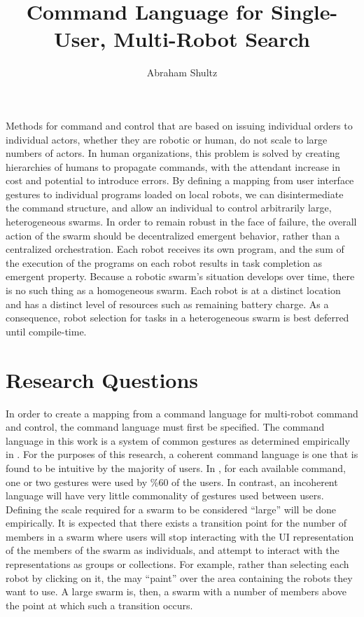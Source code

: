 \documentclass[]{article}
\title{Command Language for Single-User, Multi-Robot Search}
\author{Abraham Shultz}
\begin{document}
\maketitle

\begin{abstract}

\end{abstract}

Methods for command and control that are based on issuing individual orders to individual actors, whether they are robotic or human, do not scale to large numbers of actors. 
In human organizations, this problem is solved by creating hierarchies of humans to propagate commands, with the attendant increase in cost and potential to introduce errors. 
By defining a mapping from user interface gestures to individual programs loaded on local robots, we can disintermediate the command structure, and allow an individual to control arbitrarily large, heterogeneous swarms.
In order to remain robust in the face of failure, the overall action of the swarm should be decentralized emergent behavior, rather than a centralized orchestration. 
Each robot receives its own program, and the sum of the execution of the programs on each robot results in task completion as emergent property.
Because a robotic swarm's situation develops over time, there is no such thing as a homogeneous swarm.
Each robot is at a distinct location and has a distinct level of resources such as remaining battery charge. 
As a consequence, robot selection for tasks in a heterogeneous swarm is best deferred until compile-time.

\section{Research Questions}

In order to create a mapping from a command language for multi-robot command and control, the command language must first be specified. 
The command language in this work is a system of common gestures as determined empirically in \cite{Micire:2009:ANG:1731903.1731912}. 
For the purposes of this research, a coherent command language is one that is found to be intuitive by the majority of users. 
In \cite{Micire:2009:ANG:1731903.1731912}, for each available command, one or two gestures were used by \%60 of the users. 
In contrast, an incoherent language will have very little commonality of gestures used between users. 
Defining the scale required for a swarm to be considered ``large'' will be done empirically.
It is expected that there exists a transition point for the number of members in a swarm where users will stop interacting with the UI representation of the members of the swarm as individuals, and attempt to interact with the representations as groups or collections. 
For example, rather than selecting each robot by clicking on it, the may ``paint'' over the area containing the robots they want to use. 
A large swarm is, then, a swarm with a number of members above the point at which such a transition occurs. 
\end{document}
